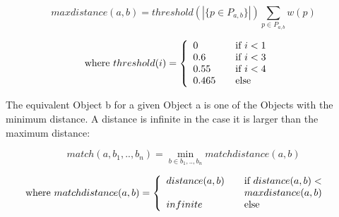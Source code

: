 $$maxdistance(a,b) = threshold(|\{p \in P_{a,b}\}|) \sum_{p \in P_{a,b}} w(p)$$

\begin{align*}
  \text{where}~
	threshold(i) &= \left\{
				\begin{array}{l l}
					0 & \quad \text{if $i < 1$}\\
					0.6 & \quad \text{if $i < 3$}\\
					0.55 & \quad \text{if $i < 4$}\\
					0.465 & \quad \text{else}
				\end{array}\right.
\end{align*}

The equivalent \gls{Object} b for a given \gls{Object} a is one of the \glspl{Object} with the minimum distance. A distance is infinite in the case it is larger than the maximum distance:

$$match(a, {b_1,..,b_n}) = \min_{b \in {b_1,..,b_n}} matchdistance(a,b) $$

\begin{align*}
  \text{where}~
	matchdistance(a,b) &= \left\{
				\begin{array}{l l}
					distance(a,b) & \quad \text{if $distance(a,b) <$ } \\ 
					& \quad \text{$maxdistance(a,b)$}\\
					infinite & \quad \text{else}
				\end{array}\right.
\end{align*}



%
%	
%	
	
	









